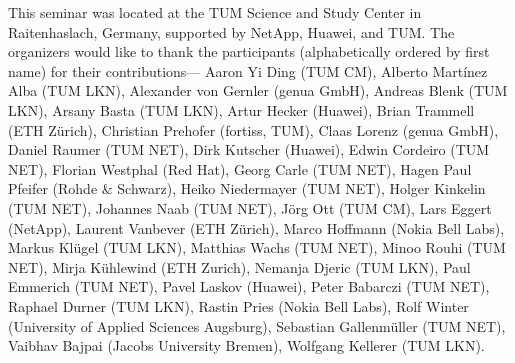 This seminar was located at the TUM Science and Study Center in Raitenhaslach,
Germany, supported by NetApp, Huawei, and TUM\@.  The organizers would like to
thank the participants (alphabetically ordered by first name) for their
contributions---%
Aaron Yi Ding (TUM CM),
Alberto Martínez Alba (TUM LKN),
Alexander von Gernler (genua GmbH),
Andreas Blenk (TUM LKN),
Arsany Basta (TUM LKN),
Artur Hecker (Huawei),
Brian Trammell (ETH Zürich),
Christian Prehofer (fortiss, TUM),
Claas Lorenz (genua GmbH),
Daniel Raumer (TUM NET),
Dirk Kutscher (Huawei),
Edwin Cordeiro (TUM NET),
Florian Westphal (Red Hat),
Georg Carle (TUM NET),
Hagen Paul Pfeifer (Rohde \& Schwarz),
Heiko Niedermayer (TUM NET),
Holger Kinkelin (TUM NET),
Johannes Naab (TUM NET),
Jörg Ott (TUM CM),
Lars Eggert (NetApp),
Laurent Vanbever (ETH Zürich),
Marco Hoffmann (Nokia Bell Labs),
Markus Klügel (TUM LKN),
Matthias Wachs (TUM NET),
Minoo Rouhi (TUM NET),
Mirja Kühlewind (ETH Zurich),
Nemanja Djeric (TUM LKN),
Paul Emmerich (TUM NET),
Pavel Laskov (Huawei),
Peter Babarczi (TUM NET),
Raphael Durner (TUM LKN),
Rastin Pries (Nokia Bell Labs),
Rolf Winter (University of Applied Sciences Augsburg),
Sebastian Gallenmüller (TUM NET),
Vaibhav Bajpai (Jacobs University Bremen),
Wolfgang Kellerer (TUM LKN).
